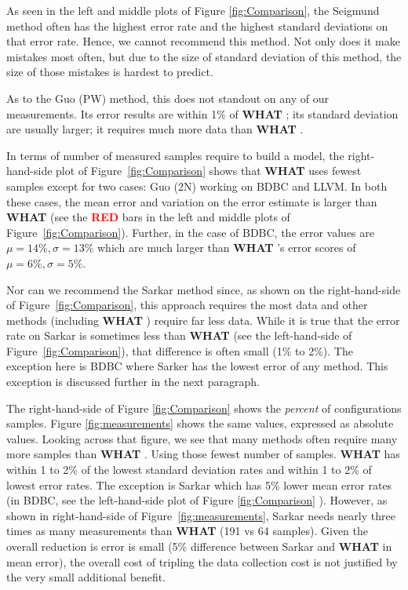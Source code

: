 \documentclass{sig-alternative}
\newcommand{\what}{{\bf WHAT }}
\begin{document}
As seen in the left and middle plots of
Figure 
\ref{fig:Comparison}, 
the Seigmund  method often has the highest
error rate and the highest
standard deviations on that error rate. Hence,
we cannot recommend this method. Not only
does it make mistakes most often, but due to
the size of standard deviation of this method, the  size of those
mistakes is hardest to predict. 


As to the Guo (PW) method, this   does not standout on any of
our measurements. Its error results are within 1\% of \what;
 its standard deviation are usually larger; it requires
 much more data than \what.
 
 In terms of number of measured samples require to build a model, 
 the right-hand-side plot of  Figure~\ref{fig:Comparison}  shows that
 \what uses fewest samples except for two cases:
 Guo (2N) working on BDBC and LLVM.  In both these cases, the mean error and variation on the error
 estimate is   larger than \what  (see the \textcolor{red}{{\bf RED}} bars in the left and middle plots   of Figure~\ref{fig:Comparison}). Further, in the case of BDBC, the error values
 are  $\mu=14\%, \sigma=13\%$ which are much larger
than \what's error scores of $\mu=6\%, \sigma=5\%$. 

Nor can we recommend the Sarkar  method since,
as shown on the right-hand-side of Figure~\ref{fig:Comparison}, 
this approach requires the most data and other
methods (including \what) require far less data.
While it is true that the error rate on Sarkar
is sometimes less than \what (see the left-hand-side of
Figure~\ref{fig:Comparison}), that difference is often small (1\%
to 2\%). The exception here is BDBC where Sarker has the lowest
error of any method. This exception is discussed further in the
next paragraph.
 
 


The right-hand-side of Figure \ref{fig:Comparison}   shows
the {\em percent} of configurations samples. Figure \ref{fig:measurements} shows the same values,
expressed as absolute values. Looking across that figure,
we see that many methods often require many more samples than
\what.  Using those fewest number of samples. \what has
within 1 to 2\% of the lowest standard deviation rates 
and within 1 to 2\% of lowest error rates.
The exception is Sarkar which has 5\% lower mean error
rates (in BDBC, see the left-hand-side plot of Figure \ref{fig:Comparison} ).  However, 
as shown in right-hand-side of Figure~\ref{fig:measurements}, Sarkar needs nearly three times
as many measurements than \what (191 vs 64 samples). Given
the overall reduction is error is   small (5\% difference
between Sarkar and \what in mean error), the overall
cost of tripling the data collection cost is
not justified by the very small additional benefit. 
\end{document}
